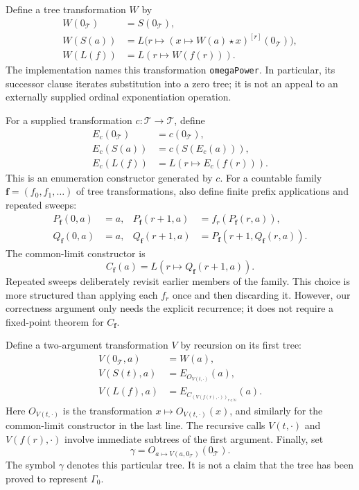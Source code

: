 Define a tree transformation $W$ by
\begin{align*}
 W(0_{\mathcal T})&=S(0_{\mathcal T}),\\
 W(S(a))&=L\bigl(r\mapsto(x\mapsto W(a)\star x)^{[r]}(0_{\mathcal T})\bigr),\\
 W(L(f))&=L(r\mapsto W(f(r))).
\end{align*}
The implementation names this transformation \texttt{omegaPower}.  In
particular, its successor clause iterates substitution into a zero tree;
it is not an appeal to an externally supplied ordinal exponentiation
operation.

For a supplied transformation $c:\mathcal T\to\mathcal T$, define
\begin{align*}
 E_c(0_{\mathcal T})&=c(0_{\mathcal T}),\\
 E_c(S(a))&=c(S(E_c(a))),\\
 E_c(L(f))&=L(r\mapsto E_c(f(r))).
\end{align*}
This is an enumeration constructor generated by $c$.  For a countable family
$\boldsymbol f=(f_0,f_1,\ldots)$ of tree transformations, also define finite
prefix applications and repeated sweeps:
\begin{align*}
 P_{\boldsymbol f}(0,a)&=a,&
 P_{\boldsymbol f}(r+1,a)&=f_r(P_{\boldsymbol f}(r,a)),\\
 Q_{\boldsymbol f}(0,a)&=a,&
 Q_{\boldsymbol f}(r+1,a)&=
 P_{\boldsymbol f}(r+1,Q_{\boldsymbol f}(r,a)).
\end{align*}
The common-limit constructor is
\[
 C_{\boldsymbol f}(a)=L(r\mapsto Q_{\boldsymbol f}(r+1,a)).
\]
Repeated sweeps deliberately revisit earlier members of the family.  This
choice is more structured than applying each $f_r$ once and then discarding
it.  However, our correctness argument only needs the explicit recurrence;
it does not require a fixed-point theorem for $C_{\boldsymbol f}$.

Define a two-argument transformation $V$ by recursion on its first tree:
\begin{align*}
 V(0_{\mathcal T},a)&=W(a),\\
 V(S(t),a)&=E_{O_{V(t,\mathord\cdot)}}(a),\\
 V(L(f),a)&=
 E_{C_{(V(f(r),\mathord\cdot))_{r\in\mathbb N}}}(a).
\end{align*}
Here $O_{V(t,\mathord\cdot)}$ is the transformation
$x\mapsto O_{V(t,\mathord\cdot)}(x)$, and similarly for the common-limit
constructor in the last line.  The recursive calls $V(t,\mathord\cdot)$ and
$V(f(r),\mathord\cdot)$ involve immediate subtrees of the first argument.
Finally, set
\[
 \gamma=O_{a\mapsto V(a,0_{\mathcal T})}(0_{\mathcal T}).
\]
The symbol $\gamma$ denotes this particular tree.  It is not a claim that
the tree has been proved to represent $\Gamma_0$.

